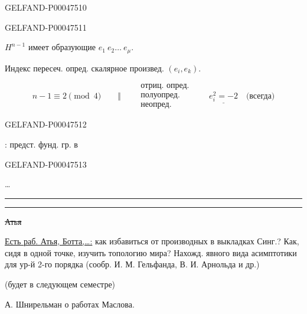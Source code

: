 \begin{GelfandAdjacentEvidence}{GELFAND-P000475}{10}


\end{GelfandAdjacentEvidence}
\begin{GelfandAdjacentEvidence}{GELFAND-P000475}{11}

$H^{n-1}$ имеет образующие $e_1\ e_2\ldots\ e_\mu$.

Индекс пересеч. опред. скалярное произвед. $(e_i,e_k)$.

\[
n-1\equiv2\pmod4\qquad\Vert\qquad
\begin{gathered}
\text{отриц. опред.}\\
\text{полуопред.}\\
\text{неопред.}
\end{gathered}
\qquad\underline{e_i^2=-2}\quad\text{(всегда)}
\]
\end{GelfandAdjacentEvidence}
\begin{GelfandAdjacentEvidence}{GELFAND-P000475}{12}


: предст. фунд. гр. в
\end{GelfandAdjacentEvidence}
\begin{GelfandAdjacentEvidence}{GELFAND-P000475}{13}

\ldots

{\centering\rule{4em}{1pt}\quad\textbullet\quad\rule{4em}{1pt}\par}

\sout{Атья}
\end{GelfandAdjacentEvidence}

\uline{Есть раб. Атья, Ботта,\ldots:} как избавиться от производных в выкладках Синг.?
Как, сидя в одной точке, изучить топологию мира? Нахожд. явного вида асимптотики для ур-й 2-го порядка (сообр. И. М. Гельфанда, В. И. Арнольда и др.)

(будет в следующем семестре)

А. Шнирельман о работах Маслова.


